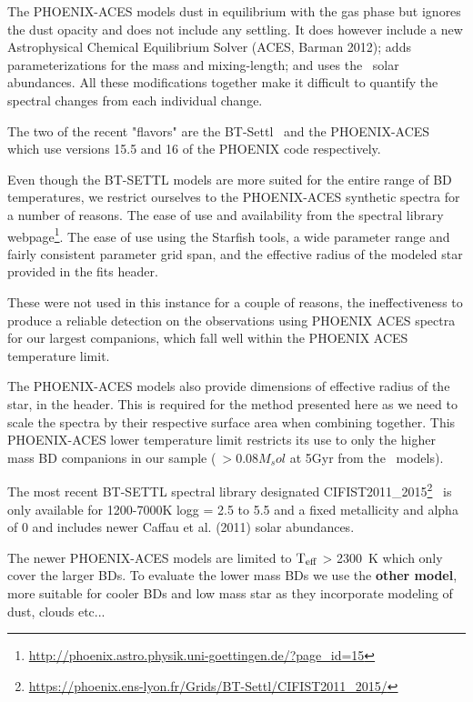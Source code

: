 The PHOENIX-ACES models dust in equilibrium with the gas phase but ignores the dust opacity and does not include any settling. It does however include a new Astrophysical Chemical Equilibrium Solver (ACES,
Barman 2012); adds parameterizations for the mass and mixing-length; and uses the~\citet{asplund_chemical_2009} solar abundances. All these modifications together make it difficult to quantify the spectral changes from each individual change.

The two of the recent "flavors" are the BT-Settl~\citep{allard_model_2010, baraffe_new_2015} and the PHOENIX-ACES~\citep{husser_new_2013} which use versions 15.5 and 16 of the PHOENIX code respectively.

Even though the BT-SETTL models are more suited for the entire range of BD temperatures, we restrict ourselves to the PHOENIX-ACES synthetic spectra for a number of reasons. The ease of use and availability from the spectral library webpage\footnote{\url{http://phoenix.astro.physik.uni-goettingen.de/?page_id=15}}. The ease of use using the Starfish tools, a wide parameter range and fairly consistent parameter grid span, and the effective radius of the modeled star provided in the fits header.

These were not used in this instance for a couple of reasons, the ineffectiveness to produce a reliable detection on the observations using PHOENIX ACES spectra for our largest companions, which fall well within the PHOENIX ACES temperature limit.

The PHOENIX-ACES models also provide dimensions of effective radius of the star, in the header. This is required for the method presented here as we need to scale the spectra by their respective surface area when combining together.
This PHOENIX-ACES lower temperature limit restricts its use to only the higher mass BD companions in our sample (\(~>0.08 M_sol\) at 5Gyr from the~\citet{baraffe_evolutionary_2003} models).


The most recent BT-SETTL spectral library designated CIFIST2011\_2015\footnote{\url{https://phoenix.ens-lyon.fr/Grids/BT-Settl/CIFIST2011_2015/}}~\citep{baraffe_new_2015} is only available for 1200-7000K logg = 2.5 to 5.5 and a fixed metallicity and alpha of 0 and includes newer Caffau et al. (2011) solar abundances.

The newer PHOENIX-ACES models are limited to \(\rm T_{eff} \) > 2300~K which only cover the larger BDs. To evaluate the lower mass BDs we use the \textbf{other model}, more suitable for cooler BDs and low mass star as they incorporate modeling of dust, clouds etc...


